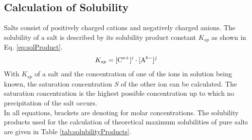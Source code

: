 \documentclass[11pt]{scrartcl}
\begin{document}

\subsection{Calculation of Solubility}
Salts consist of positively charged cations and negatively charged anions. The solubility of a salt is described by its solubility product constant $K_{sp}$ as shown in Eq. \ref{eq:solProduct}.
%
\begin{align}
	K_{sp} = [\ce{C^{a+}}]^{i} \cdot [\ce{A^{b-}}]^{j}
	\label{eq:solProduct}
\end{align}
%
With $K_{sp}$ of a salt and the concentration of one of the ions in solution being known, the saturation concentration $S$ of the other ion can be calculated. The saturation concentration is the highest possible concentration up to which no precipitation of the salt occurs.\\
In all equations, brackets are denoting for molar concentrations. The solubility products used for the calculation of theoretical maximum solubilities of pure salts are given in Table \ref{tab:solubilityProducts}. 




\end{document}
